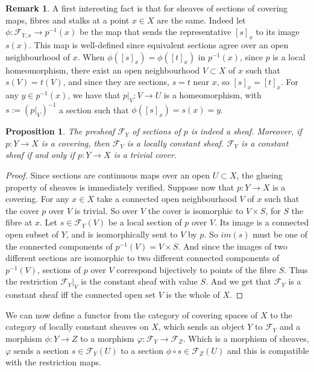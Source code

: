 \documentclass{article}
\theoremstyle{plain}
\newtheorem{proposition}[theorem]{Proposition}
\theoremstyle{definition}
\newtheorem{remark}{Remark}
\begin{document}
\begin{remark}
\label{fibres_are_stalks}
    A first interesting fact is that for sheaves of sections of covering maps, fibres and stalks at a point $x\in X$ are the same. 
    Indeed let $\phi: \mathcal{F}_{Y,x}\rightarrow p^{-1}(x)$ be the map that sends the representative $[s]_x$ to its image $s(x)$. This map is well-defined since equivalent sections agree over an open neighbourhood of $x$.
    When $\phi([s]_x) = \phi([t]_x)$ in $p^{-1}(x)$, since $p$ is a local homeomorphism, there exist an open neighbourhood $V\subset X$ of $x$ such that $s(V)=t(V)$, and since they are sections, $s=t$ near $x$, so $[s]_x=[t]_x$.
    For any $y\in p^{-1}(x)$, we have that $p\vert_V:V\rightarrow U$ is a homeomorphism, with $s:=(p\vert_V)^{-1}$ a section such that $\phi([s]_x) = s(x) = y$. 
\end{remark}





\begin{proposition}
\label{sheaf_of_sections_if_of_cover}
    The presheaf $\mathcal{F}_Y$ of sections of $p$ is indeed a sheaf. Moreover, if $p:Y \rightarrow X$ is a covering, then $\mathcal{F}_Y$ is a locally constant sheaf. $\mathcal{F}_Y$ is a constant sheaf if and only if $p:Y\rightarrow X$ is a trivial cover.
\end{proposition}
\begin{proof}
    Since sections are continuous maps over an open $U\subset X$, the glueing property of sheaves is immediately verified.
    Suppose now that $p:Y\rightarrow X$ is a covering. For any $x\in X$ take a connected open neighbourhood $V$ of $x$ such that the cover $p$ over $V$ is trivial. So over $V$ the cover is isomorphic to $V\times S$, for $S$ the fibre at $x$.
    Let $s\in\mathcal{F}_Y(V)$ be a local section of $p$ over $V$. 
    Its image is a connected open subset of $Y$, and is isomorphically sent to $V$ by $p$.
    So $im(s)$ must be one of the connected components of $p^{-1}(V) = V\times S$. And since the images of two different sections are isomorphic to two different connected components of $p^{-1}(V)$, sections of $p$ over $V$ correspond bijectively to points of the fibre $S$. Thus the restriction $\mathcal{F}_Y\vert_V$ is the constant sheaf with value $S$.
    And we get that $\mathcal{F}_Y$ is a constant sheaf iff the connected open set $V$ is the whole of $X$.
\end{proof}


\noindent We can now define a functor from the category of covering spaces of $X$ to the category of locally constant sheaves on $X$, which sends an object $Y$ to $\mathcal{F}_Y$ and a morphism $\phi :Y\rightarrow Z$ to a morphism $\varphi : \mathcal{F}_Y \rightarrow \mathcal{F}_Z$. 
Which is a morphism of sheaves, $\varphi$ sends a section $s\in \mathcal{F}_Y(U)$ to a section $\phi\circ s\in \mathcal{F}_Z(U)$ and this is compatible with the restriction maps.\\
\end{document}
